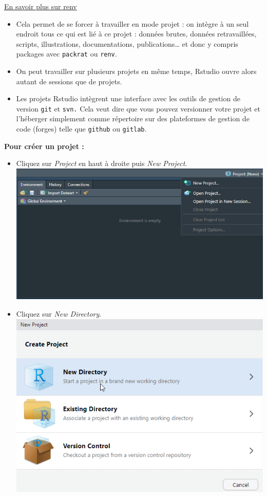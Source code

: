 \documentclass[
]{book}
\begin{document}
\href{https://rstudio.github.io/renv/}{En savoir plus sur renv}

\begin{itemize}
\item
  Cela permet de se forcer à travailler en mode projet : on intègre à un seul endroit tous ce qui est lié à ce projet : données brutes, données retravaillées, scripts, illustrations, documentations, publications\ldots{} et donc y compris packages avec \texttt{packrat} ou \texttt{renv}.
\item
  On peut travailler sur plusieurs projets en même temps, Rstudio ouvre alors autant de sessions que de projets.
\item
  Les projets Rstudio intègrent une interface avec les outils de gestion de version \texttt{git} et \texttt{svn.} Cela veut dire que vous pouvez versionner votre projet et l'héberger simplement comme répertoire sur des plateformes de gestion de code (forges) telle que \texttt{github} ou \texttt{gitlab}.
\end{itemize}

\textbf{Pour créer un projet : }

\begin{itemize}
\item
  Cliquez sur \emph{Project} en haut à droite puis \emph{New Project}.
  \includegraphics[width=5.20833in,height=\textheight]{pic/creerprojet1.png}
\item
  Cliquez sur \emph{New Directory}.
  \includegraphics[width=5.20833in,height=\textheight]{pic/creerprojet2.png}
\end{itemize}
\end{document}
